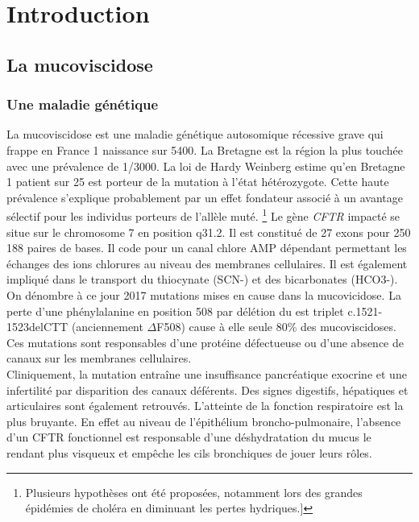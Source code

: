 \documentclass[12pt,a4paper]{article}
\begin{document}
\newpage

\setcounter{page}{1}

\section{Introduction}
\subsection{La mucoviscidose}
\subsubsection{Une maladie génétique}
La mucoviscidose est une maladie génétique autosomique récessive grave qui frappe en France 1 naissance sur 5400\cite{Registredelamuco.org}. La Bretagne est la région la plus touchée avec une prévalence de 1/3000\cite{Registredelamuco.org}.
La loi de Hardy Weinberg estime qu’en Bretagne 1 patient sur 25 est porteur de la mutation à l’état hétérozygote. Cette haute prévalence s’explique probablement par un effet fondateur associé à un avantage sélectif pour les individus porteurs de l’allèle muté. \footnote{Plusieurs hypothèses ont été proposées, notamment lors des grandes épidémies de choléra en diminuant les pertes hydriques.]} 
Le gène \textit{CFTR} impacté se situe sur le chromosome 7 en position q31.2. Il est constitué de 27 exons pour 250 188\cite{OLeary2016} paires de bases. Il code pour un canal chlore AMP dépendant permettant les échanges des ions chlorures au niveau des membranes cellulaires. Il est également impliqué dans le transport du thiocynate (SCN-) et des bicarbonates (HCO3-)\cite{Quinton2001}. 
On dénombre à ce jour 2017 mutations \cite{cftrdb} mises en cause dans la mucovicidose. La perte d’une phénylalanine en position 508 par délétion du est triplet c.1521-1523delCTT (anciennement $\Delta$F508) cause à elle seule 80\% des mucoviscidoses\cite{cftrdb}.
Ces mutations sont responsables d’une protéine défectueuse ou d’une absence de canaux sur les membranes cellulaires. \\
Cliniquement, la mutation entraîne une insuffisance pancréatique exocrine et une infertilité par disparition des canaux déférents. Des signes digestifs, hépatiques et articulaires sont également retrouvés.
L'atteinte de la fonction respiratoire est la plus bruyante. En effet au niveau de l’épithélium broncho-pulmonaire, l’absence d’un CFTR fonctionnel est responsable d’une déshydratation du mucus le rendant plus visqueux et empêche les cils bronchiques de jouer leurs rôles.\\
\end{document}
